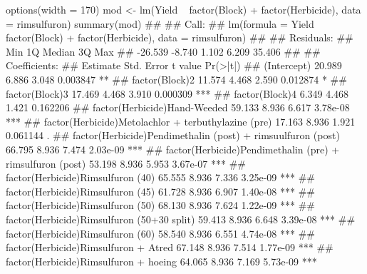 \documentclass[a4paper,12pt,oneside]{book}
\newenvironment{Shaded}{}{}
\newcommand{\KeywordTok}[1]{#1}
\newcommand{\DataTypeTok}[1]{#1}
\newcommand{\DecValTok}[1]{#1}
\newcommand{\StringTok}[1]{#1}
\newcommand{\CommentTok}[1]{#1}
\newcommand{\OperatorTok}[1]{#1}
\newcommand{\NormalTok}[1]{#1}
\begin{document}
\begin{Shaded}
\begin{Highlighting}[]
\KeywordTok{options}\NormalTok{(}\DataTypeTok{width =} \DecValTok{170}\NormalTok{)}
\NormalTok{mod <-}\StringTok{ }\KeywordTok{lm}\NormalTok{(Yield }\OperatorTok{~}\StringTok{ }\KeywordTok{factor}\NormalTok{(Block) }\OperatorTok{+}\StringTok{ }\KeywordTok{factor}\NormalTok{(Herbicide), }\DataTypeTok{data =}\NormalTok{ rimsulfuron)}
\KeywordTok{summary}\NormalTok{(mod)}
\CommentTok{## }
\CommentTok{## Call:}
\CommentTok{## lm(formula = Yield ~ factor(Block) + factor(Herbicide), data = rimsulfuron)}
\CommentTok{## }
\CommentTok{## Residuals:}
\CommentTok{##     Min      1Q  Median      3Q     Max }
\CommentTok{## -26.539  -8.740   1.102   6.209  35.406 }
\CommentTok{## }
\CommentTok{## Coefficients:}
\CommentTok{##                                                             Estimate Std. Error t value Pr(>|t|)    }
\CommentTok{## (Intercept)                                                   20.989      6.886   3.048 0.003847 ** }
\CommentTok{## factor(Block)2                                                11.574      4.468   2.590 0.012874 *  }
\CommentTok{## factor(Block)3                                                17.469      4.468   3.910 0.000309 ***}
\CommentTok{## factor(Block)4                                                 6.349      4.468   1.421 0.162206    }
\CommentTok{## factor(Herbicide)Hand-Weeded                                  59.133      8.936   6.617 3.78e-08 ***}
\CommentTok{## factor(Herbicide)Metolachlor + terbuthylazine (pre)           17.163      8.936   1.921 0.061144 .  }
\CommentTok{## factor(Herbicide)Pendimethalin (post) + rimsuulfuron (post)   66.795      8.936   7.474 2.03e-09 ***}
\CommentTok{## factor(Herbicide)Pendimethalin (pre) + rimsulfuron (post)     53.198      8.936   5.953 3.67e-07 ***}
\CommentTok{## factor(Herbicide)Rimsulfuron (40)                             65.555      8.936   7.336 3.25e-09 ***}
\CommentTok{## factor(Herbicide)Rimsulfuron (45)                             61.728      8.936   6.907 1.40e-08 ***}
\CommentTok{## factor(Herbicide)Rimsulfuron (50)                             68.130      8.936   7.624 1.22e-09 ***}
\CommentTok{## factor(Herbicide)Rimsulfuron (50+30 split)                    59.413      8.936   6.648 3.39e-08 ***}
\CommentTok{## factor(Herbicide)Rimsulfuron (60)                             58.540      8.936   6.551 4.74e-08 ***}
\CommentTok{## factor(Herbicide)Rimsulfuron + Atred                          67.148      8.936   7.514 1.77e-09 ***}
\CommentTok{## factor(Herbicide)Rimsulfuron + hoeing                         64.065      8.936   7.169 5.73e-09 ***}

\end{Highlighting}
\end{Shaded}
\end{document}

